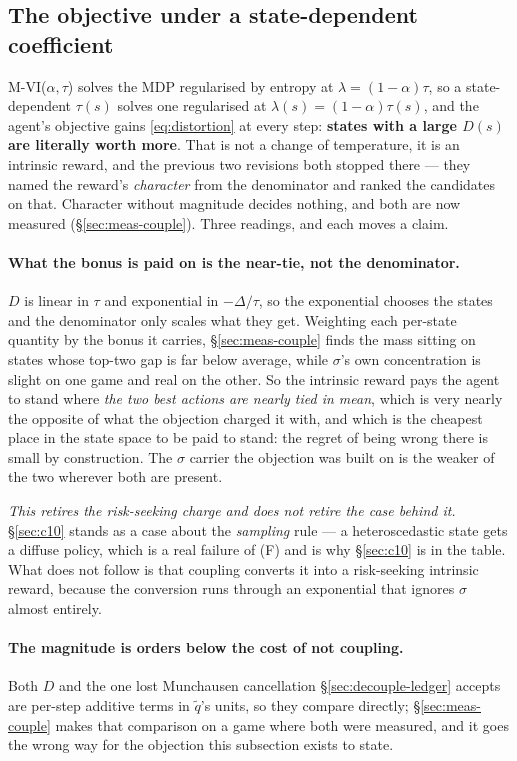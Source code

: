 \documentclass{article}
\newcommand{\gap}{\Delta}
\newcommand{\srank}{\sigma}
\begin{document}
\subsection{The objective under a state-dependent coefficient}
\label{sec:c8}

M-VI($\alpha, \tau$) solves the MDP regularised by entropy at $\lambda = (1-\alpha)\tau$, so a
state-dependent $\tau(s)$ solves one regularised at $\lambda(s) = (1-\alpha)\tau(s)$, and the
agent's objective gains \eqref{eq:distortion} at every step: \textbf{states with a large $D(s)$
are literally worth more}. That is not a change of temperature, it is an intrinsic reward, and
the previous two revisions both stopped there --- they named the reward's \emph{character} from
the denominator and ranked the candidates on that. Character without magnitude decides nothing,
and both are now measured (\S\ref{sec:meas-couple}). Three readings, and each moves a claim.

\paragraph{What the bonus is paid on is the near-tie, not the denominator.} $D$ is linear in
$\tau$ and exponential in $-\gap/\tau$, so the exponential chooses the states and the denominator
only scales what they get. Weighting each per-state quantity by the bonus it carries,
\S\ref{sec:meas-couple} finds the mass sitting on states whose top-two gap is far below average,
while $\srank$'s own concentration is slight on one game and real on the other. So the intrinsic
reward pays the agent to stand where \emph{the two best actions are nearly tied in mean}, which is
very nearly the opposite of what the objection charged it with, and which is the cheapest place in
the state space to be paid to stand: the regret of being wrong there is small by construction. The
$\srank$ carrier the objection was built on is the weaker of the two wherever both are present.

\emph{This retires the risk-seeking charge and does not retire the case behind it.}
\S\ref{sec:c10} stands as a case about the \emph{sampling} rule --- a heteroscedastic state gets a
diffuse policy, which is a real failure of (F) and is why \S\ref{sec:c10} is in the table. What
does not follow is that coupling converts it into a risk-seeking intrinsic reward, because the
conversion runs through an exponential that ignores $\srank$ almost entirely.

\paragraph{The magnitude is orders below the cost of not coupling.} Both $D$ and the one lost
Munchausen cancellation \S\ref{sec:decouple-ledger} accepts are per-step additive terms in
$\tilde{q}$'s units, so they compare directly; \S\ref{sec:meas-couple} makes that comparison on a
game where both were measured, and it goes the wrong way for the objection this subsection exists
to state.
\end{document}
